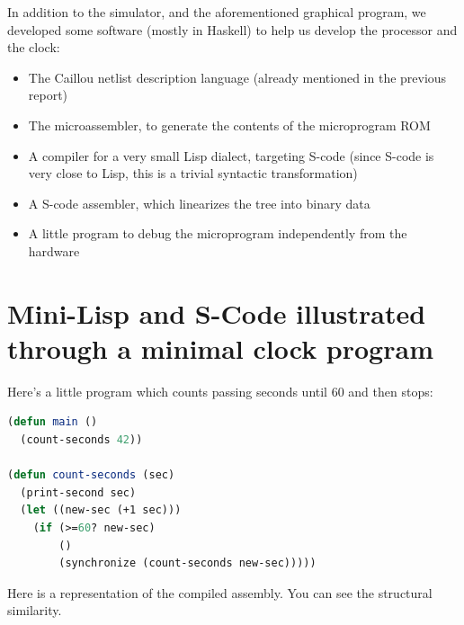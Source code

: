 \documentclass[a4paper, 11pt]{article}
\begin{document}
In addition to the simulator, and the aforementioned graphical program, we developed some software (mostly in Haskell) to help us develop the processor and the clock:
\begin{itemize}
\item The Caillou netlist description language (already mentioned in the previous report)
\item The microassembler, to generate the contents of the microprogram ROM
\item A compiler for a very small Lisp dialect, targeting S-code (since S-code is very close to Lisp, this is a trivial syntactic transformation)
\item A S-code assembler, which linearizes the tree into binary data
\item A little program to debug the microprogram independently from the hardware
\end{itemize}


\newpage
\appendix


\section{Mini-Lisp and S-Code illustrated through a minimal clock program}

Here's a little program which counts passing seconds until 60 and then stops:

\begin{lstlisting}[language=Lisp]
(defun main ()
  (count-seconds 42))

(defun count-seconds (sec)
  (print-second sec)
  (let ((new-sec (+1 sec)))
    (if (>=60? new-sec)
        ()  
        (synchronize (count-seconds new-sec)))))
\end{lstlisting}

Here is a representation of the compiled assembly. You can see the structural similarity.
\end{document}
